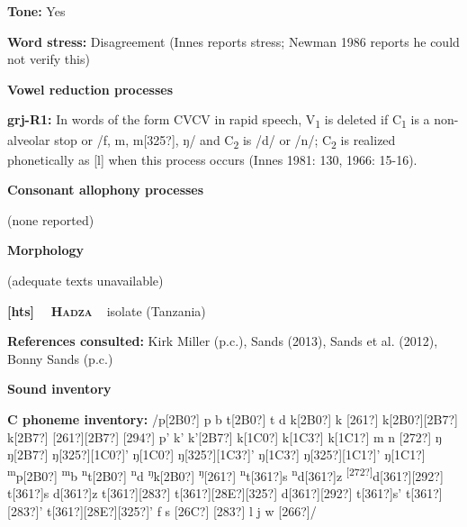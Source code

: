 \begin{styleBody}
\textbf{Tone:} Yes
\end{styleBody}

\begin{styleBody}
\textbf{Word stress:} Disagreement (Innes reports stress; Newman 1986 reports he could not verify this)
\end{styleBody}

\begin{styleBody}
\textbf{Vowel reduction processes}
\end{styleBody}

\begin{styleBody}
\textbf{grj-R1:} In words of the form CVCV in rapid speech, V\textsubscript{1} is deleted if C\textsubscript{1} is a non-alveolar stop or /f, m, m[325?], ŋ/ and C\textsubscript{2} is /d/ or /n/; C\textsubscript{2} is realized phonetically as [l] when this process occurs (Innes 1981: 130, 1966: 15-16).
\end{styleBody}

\begin{styleBody}
\textbf{Consonant allophony processes}
\end{styleBody}

\begin{styleBody}
(none reported)
\end{styleBody}

\begin{styleBody}
\textbf{Morphology}
\end{styleBody}

\begin{styleBody}
(adequate texts unavailable)
\end{styleBody}

\clearpage\begin{styleBody}
\textbf{[hts] }\ \ \textbf{\textsc{Hadza}}\textbf{\ \ }isolate (Tanzania)
\end{styleBody}

\begin{styleBody}
\textbf{References consulted: }Kirk Miller (p.c.), Sands (2013), Sands et al. (2012), Bonny Sands (p.c.)
\end{styleBody}

\begin{styleBody}
\textbf{Sound inventory}
\end{styleBody}

\begin{styleBody}
\textbf{C phoneme inventory:} /p[2B0?] p b t[2B0?] t d k[2B0?] k [261?] k[2B0?][2B7?] k[2B7?] [261?][2B7?] [294?] p’ k’ k’[2B7?] k[1C0?] k[1C3?] k[1C1?] m n [272?] ŋ ŋ[2B7?] ŋ[325?][1C0?]’ ŋ[1C0?] ŋ[325?][1C3?]’ ŋ[1C3?] ŋ[325?][1C1?]’ ŋ[1C1?] \textsuperscript{m}p[2B0?] \textsuperscript{m}b \textsuperscript{n}t[2B0?] \textsuperscript{n}d \textsuperscript{ŋ}k[2B0?] \textsuperscript{ŋ}[261?] \textsuperscript{n}t[361?]s \textsuperscript{n}d[361?]z \textsuperscript{[272?]}d[361?][292?] t[361?]s d[361?]z t[361?][283?] t[361?][28E?][325?] d[361?][292?] t[361?]s’ t[361?][283?]’ t[361?][28E?][325?]’ f s [26C?] [283?] l j w [266?]/
\end{styleBody}

